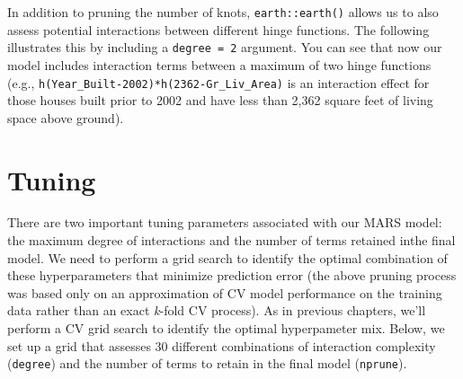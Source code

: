 \documentclass[]{krantz}
\makeatletter
\newenvironment{Shaded}{\begin{snugshade}}{\end{snugshade}}
\newcommand{\CommentTok}[1]{\textcolor[rgb]{0.37,0.37,0.37}{\textit{#1}}}
\newcommand{\DataTypeTok}[1]{\textcolor[rgb]{0.27,0.27,0.27}{#1}}
\newcommand{\DecValTok}[1]{\textcolor[rgb]{0.06,0.06,0.06}{#1}}
\newcommand{\KeywordTok}[1]{\textcolor[rgb]{0.27,0.27,0.27}{\textbf{#1}}}
\newcommand{\NormalTok}[1]{#1}
\newcommand{\OperatorTok}[1]{\textcolor[rgb]{0.43,0.43,0.43}{\textbf{#1}}}
\newcommand{\StringTok}[1]{\textcolor[rgb]{0.5,0.5,0.5}{#1}}
\newenvironment{kframe}{%
\medskip{}
\setlength{\fboxsep}{.8em}
 \def\at@end@of@kframe{}%
 \ifinner\ifhmode%
  \def\at@end@of@kframe{\end{minipage}}%
  \begin{minipage}{\columnwidth}%
 \fi\fi%
 \def\FrameCommand##1{\hskip\@totalleftmargin \hskip-\fboxsep
 \colorbox{shadecolor}{##1}\hskip-\fboxsep
     \hskip-\linewidth \hskip-\@totalleftmargin \hskip\columnwidth}%
 \MakeFramed {\advance\hsize-\width
   \@totalleftmargin\z@ \linewidth\hsize
   \@setminipage}}%
 {\par\unskip\endMakeFramed%
 \at@end@of@kframe}
\renewenvironment{Shaded}{\begin{kframe}}{\end{kframe}}
\makeatother
\begin{document}
In addition to pruning the number of knots, \texttt{earth::earth()} allows us to also assess potential interactions between different hinge functions. The following illustrates this by including a \texttt{degree\ =\ 2} argument. You can see that now our model includes interaction terms between a maximum of two hinge functions (e.g., \texttt{h(Year\_Built-2002)*h(2362-Gr\_Liv\_Area)} is an interaction effect for those houses built prior to 2002 and have less than 2,362 square feet of living space above ground).

\begin{Shaded}
\end{Shaded}

\hypertarget{tuning}{%
\section{Tuning}\label{tuning}}

There are two important tuning parameters associated with our MARS model: the maximum degree of interactions and the number of terms retained inthe final model. We need to perform a grid search to identify the optimal combination of these hyperparameters that minimize prediction error (the above pruning process was based only on an approximation of CV model performance on the training data rather than an exact \emph{k}-fold CV process). As in previous chapters, we'll perform a CV grid search to identify the optimal hyperpameter mix. Below, we set up a grid that assesses 30 different combinations of interaction complexity (\texttt{degree}) and the number of terms to retain in the final model (\texttt{nprune}).
\end{document}
